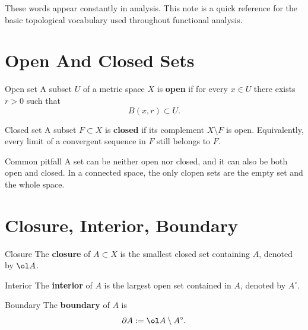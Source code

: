 \documentclass[header={Ancillary Note: Basic Topology},notheorems]{study-note}
\begin{document}

\vspace{0.8em}

\begin{focusbox}
These words appear constantly in analysis. This note is a quick reference for the basic topological vocabulary used throughout functional analysis.
\end{focusbox}

\tableofcontents

\section{Open And Closed Sets}

\begin{defbox}{Open set}
A subset $U$ of a metric space $X$ is \textbf{open} if for every $x\in U$ there exists $r>0$ such that
\[
B(x,r)\subset U.
\]
\end{defbox}

\begin{defbox}{Closed set}
A subset $F\subset X$ is \textbf{closed} if its complement $X\setminus F$ is open.
Equivalently, every limit of a convergent sequence in $F$ still belongs to $F$.
\end{defbox}

\begin{warningbox}{Common pitfall}
A set can be neither open nor closed, and it can also be both open and closed. In a connected space, the only clopen sets are the empty set and the whole space.
\end{warningbox}

\section{Closure, Interior, Boundary}

\begin{defbox}{Closure}
The \textbf{closure} of $A\subset X$ is the smallest closed set containing $A$, denoted by $\ol A$.
\end{defbox}

\begin{defbox}{Interior}
The \textbf{interior} of $A$ is the largest open set contained in $A$, denoted by $A^{\circ}$.
\end{defbox}

\begin{defbox}{Boundary}
The \textbf{boundary} of $A$ is
\[
\partial A:=\ol A\setminus A^{\circ}.
\]
\end{defbox}
\end{document}
